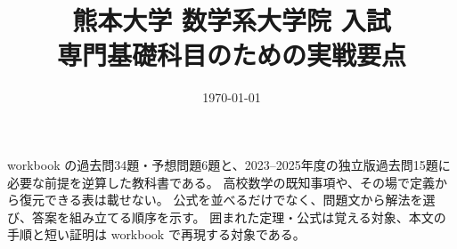 \documentclass[uplatex, dvipdfmx]{jsreport}
\title{熊本大学 数学系大学院 入試\\{\Large 専門基礎科目のための実戦要点}}
\author{}
\date{\today}
\begin{document}
\maketitle

\begin{memo*}
workbook の過去問34題・予想問題6題と、2023--2025年度の独立版過去問15題に
必要な前提を逆算した教科書である。
高校数学の既知事項や、その場で定義から復元できる表は載せない。
公式を並べるだけでなく、問題文から解法を選び、答案を組み立てる順序を示す。
囲まれた定理・公式は覚える対象、本文の手順と短い証明は workbook で再現する対象である。
\end{memo*}

\setcounter{tocdepth}{1}
\tableofcontents









\end{document}
